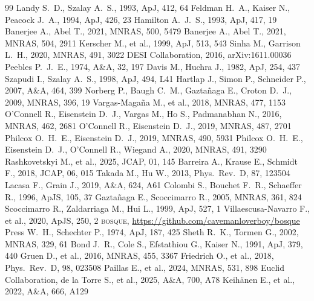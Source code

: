\documentclass[11pt]{article}
\begin{document}

\begin{thebibliography}{99}
 Landy S.~D., Szalay A.~S., 1993, ApJ, 412, 64
 Feldman H.~A., Kaiser N., Peacock J.~A., 1994, ApJ, 426, 23
 Hamilton A.~J.~S., 1993, ApJ, 417, 19
 Banerjee A., Abel T., 2021, MNRAS, 500, 5479
 Banerjee A., Abel T., 2021, MNRAS, 504, 2911
 Kerscher M., et al., 1999, ApJ, 513, 543
 Sinha M., Garrison L.~H., 2020, MNRAS, 491, 3022
 DESI Collaboration, 2016, arXiv:1611.00036
 Peebles P.~J.~E., 1974, A\&A, 32, 197
 Davis M., Huchra J., 1982, ApJ, 254, 437
 Szapudi I., Szalay A.~S., 1998, ApJ, 494, L41
 Hartlap J., Simon P., Schneider P., 2007, A\&A, 464, 399
 Norberg P., Baugh C.~M., Gazta\~naga E., Croton D.~J., 2009, MNRAS, 396, 19
 Vargas-Maga\~na M., et al., 2018, MNRAS, 477, 1153
 O'Connell R., Eisenstein D.~J., Vargas M., Ho S., Padmanabhan N., 2016, MNRAS, 462, 2681
 O'Connell R., Eisenstein D.~J., 2019, MNRAS, 487, 2701
 Philcox O.~H.~E., Eisenstein D.~J., 2019, MNRAS, 490, 5931
 Philcox O.~H.~E., Eisenstein D.~J., O'Connell R., Wiegand A., 2020, MNRAS, 491, 3290
 Rashkovetskyi M., et al., 2025, JCAP, 01, 145
 Barreira A., Krause E., Schmidt F., 2018, JCAP, 06, 015
 Takada M., Hu W., 2013, Phys.\ Rev.\ D, 87, 123504
 Lacasa F., Grain J., 2019, A\&A, 624, A61
 Colombi S., Bouchet F.~R., Schaeffer R., 1996, ApJS, 105, 37
 Gazta\~naga E., Scoccimarro R., 2005, MNRAS, 361, 824
 Scoccimarro R., Zaldarriaga M., Hui L., 1999, ApJ, 527, 1
 Villaescusa-Navarro F., et al., 2020, ApJS, 250, 2
 \textsc{bosque}, \url{https://github.com/cavemanloverboy/bosque}
 Press W.~H., Schechter P., 1974, ApJ, 187, 425
 Sheth R.~K., Tormen G., 2002, MNRAS, 329, 61
 Bond J.~R., Cole S., Efstathiou G., Kaiser N., 1991, ApJ, 379, 440
 Gruen D., et al., 2016, MNRAS, 455, 3367
 Friedrich O., et al., 2018, Phys.\ Rev.\ D, 98, 023508
 Paillas E., et al., 2024, MNRAS, 531, 898
 Euclid Collaboration, de la Torre S., et al., 2025, A\&A, 700, A78
 Keih\"anen E., et al., 2022, A\&A, 666, A129
\end{thebibliography}
\end{document}
